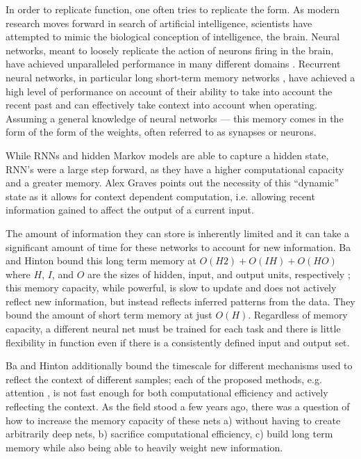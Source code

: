 \documentclass{article}
\begin{document}
In order to replicate function, one often tries to replicate the form. As modern
research moves forward in search of artificial intelligence, scientists have attempted to
mimic the biological conception of intelligence, the brain.
Neural networks, meant to loosely replicate the action of neurons firing in the brain,
have achieved unparalleled performance in many different domains \cite{AlexNet, Mnih13, AlphaGo, Seq2Seq, GoogleTranslation}. Recurrent
neural networks, in particular long short-term memory networks
\cite{Hochreiter97}, have achieved a high level of performance
on account of their ability to take into account the recent past and can effectively
take context into account when operating. Assuming a general knowledge of neural
networks --- this memory comes in the form of the form of the weights, often
referred to as synapses or neurons.

While RNNs and hidden Markov models are able to capture
a hidden state, RNN's were a large step forward, as they have a higher computational capacity
and a greater memory. Alex Graves \cite{Graves14} points out the necessity of this ``dynamic'' state
as it allows for context dependent computation, i.e. allowing recent information gained
to affect the output of a current input.



The amount of information they can store is inherently limited and it
can take a significant amount of time for these networks to account for new
information. Ba and Hinton bound this long term memory at
$O(H2) + O(IH) + O(HO)$ where $H$, $I$, and $O$ are the sizes of hidden, input,
and output units, respectively \cite{BaHinton16}; this memory capacity, while powerful, is slow to update
and does not actively reflect new information, but instead reflects inferred
patterns from the data. They bound the amount of short term
memory at just $O(H)$. Regardless of memory capacity, a different neural net
must be trained for each task and there is little flexibility in function even
if there is a consistently defined input and output set.

Ba and Hinton  additionally bound
the timescale for different mechanisms used to reflect the context of different
samples; each of the proposed methods, e.g. attention \cite{BahdanauCB14},
is not fast enough for both computational efficiency and actively reflecting
the context. As the field stood a few years ago, there was a question of how to increase the
memory capacity of these nets a) without having to create arbitrarily deep nets,
b) sacrifice computational efficiency, c) build long term memory while also
being able to heavily weight new information.
\end{document}
